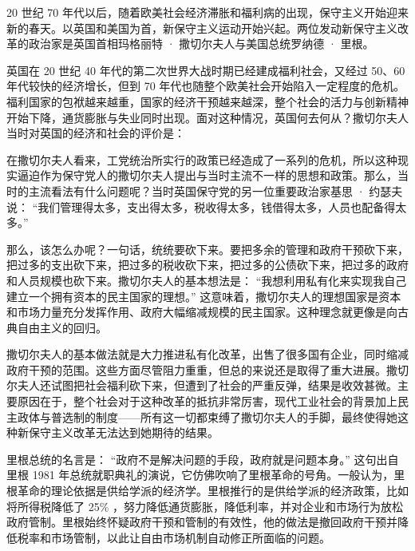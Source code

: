 
20 世纪 70 年代以后，随着欧美社会经济滞胀和福利病的出现，保守主义开始迎来新的春天。以英国和美国为首，新保守主义运动开始兴起。两位发动新保守主义改革的政治家是英国首相玛格丽特 · 撒切尔夫人与美国总统罗纳德 · 里根。

英国在 20 世纪 40 年代的第二次世界大战时期已经建成福利社会，又经过 50、60 年代较快的经济增长，但到 70 年代也随整个欧美社会开始陷入一定程度的危机。福利国家的包袱越来越重，国家的经济干预越来越深，整个社会的活力与创新精神开始下降，通货膨胀与失业同时出现。面对这种情况，英国何去何从？撒切尔夫人当时对英国的经济和社会的评价是：


在撒切尔夫人看来，工党统治所实行的政策已经造成了一系列的危机，所以这种现实逼迫作为保守党人的撒切尔夫人提出与当时主流不一样的思想和政策。那么，当时的主流看法有什么问题呢？当时英国保守党的另一位重要政治家基思 · 约瑟夫说： “我们管理得太多，支出得太多，税收得太多，钱借得太多，人员也配备得太多。” 

那么，该怎么办呢？一句话，统统要砍下来。要把多余的管理和政府干预砍下来，把过多的支出砍下来，把过多的税收砍下来，把过多的公债砍下来，把过多的政府和人员规模也砍下来。撒切尔夫人的基本想法是： “我想利用私有化来实现我自己建立一个拥有资本的民主国家的理想。” 这意味着，撒切尔夫人的理想国家是资本和市场力量充分发挥作用、政府大幅缩减规模的民主国家。这种理念就更像是向古典自由主义的回归。

撒切尔夫人的基本做法就是大力推进私有化改革，出售了很多国有企业，同时缩减政府干预的范围。这些方面尽管阻力重重，但总的来说还是取得了重大进展。撒切尔夫人还试图把社会福利砍下来，但遭到了社会的严重反弹，结果是收效甚微。主要原因在于，整个社会对于这种改革的抵抗非常厉害，现代工业社会的背景加上民主政体与普选制的制度——所有这一切都束缚了撒切尔夫人的手脚，最终使得她这种新保守主义改革无法达到她期待的结果。

里根总统的名言是： “政府不是解决问题的手段，政府就是问题本身。” 这句出自里根 1981 年总统就职典礼的演说，它仿佛吹响了里根革命的号角。一般认为，里根革命的理论依据是供给学派的经济学。里根推行的是供给学派的经济政策，比如将所得税降低了 25\% ，努力降低通货膨胀，降低利率，并对企业和市场行为放松政府管制。里根始终怀疑政府干预和管制的有效性，他的做法是撤回政府干预并降低税率和市场管制，以此让自由市场机制自动修正所面临的问题。

